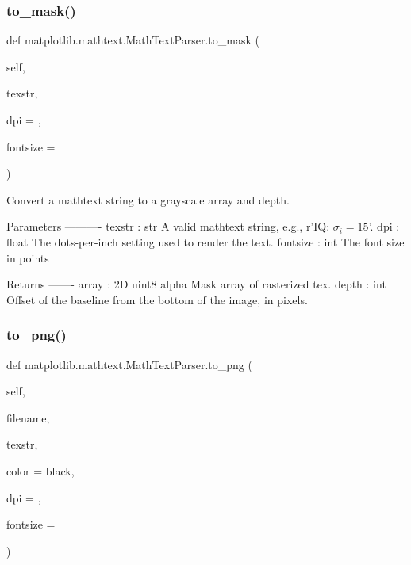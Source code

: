 \subsubsection{\texorpdfstring{to\+\_\+mask()}{to\_mask()}}
{\footnotesize\ttfamily def matplotlib.\+mathtext.\+Math\+Text\+Parser.\+to\+\_\+mask (\begin{DoxyParamCaption}\item[{}]{self,  }\item[{}]{texstr,  }\item[{}]{dpi = {},  }\item[{}]{fontsize = {} }\end{DoxyParamCaption})}

\begin{DoxyVerb}Convert a mathtext string to a grayscale array and depth.

Parameters
----------
texstr : str
    A valid mathtext string, e.g., r'IQ: $\sigma_i=15$'.
dpi : float
    The dots-per-inch setting used to render the text.
fontsize : int
    The font size in points

Returns
-------
array : 2D uint8 alpha
    Mask array of rasterized tex.
depth : int
    Offset of the baseline from the bottom of the image, in pixels.
\end{DoxyVerb}
 \mbox{\label{classmatplotlib_1_1mathtext_1_1MathTextParser_a6cfd30112a8b16bf7eabd4d8ae388b98}} 
\subsubsection{\texorpdfstring{to\+\_\+png()}{to\_png()}}
{\footnotesize\ttfamily def matplotlib.\+mathtext.\+Math\+Text\+Parser.\+to\+\_\+png (\begin{DoxyParamCaption}\item[{}]{self,  }\item[{}]{filename,  }\item[{}]{texstr,  }\item[{}]{color = {\ttfamily \textquotesingle{}black\textquotesingle{}},  }\item[{}]{dpi = {},  }\item[{}]{fontsize = {} }\end{DoxyParamCaption})}

